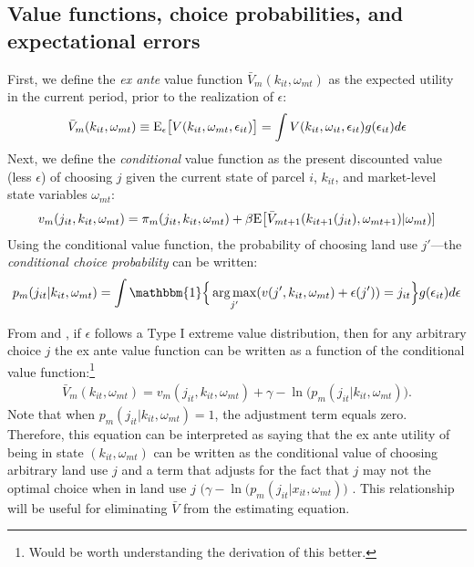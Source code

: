 \documentclass[11pt]{article}
\newcommand{\Exp}{\textnormal{E}}
\DeclareMathOperator*{\argmax}{arg\,max}
\begin{document}
\subsection{Value functions, choice probabilities, and expectational errors}

First, we define the {\em ex ante} value function $\bar{V}_m(k_{it},\omega_{mt})$ as the expected utility in the current period, prior to the realization of $\epsilon$:
\begin{align} \label{eq:exante}
\bar{V}_m(k_{it},\omega_{mt}) \equiv \Exp_\epsilon \big[V(k_{it},\omega_{mt},\epsilon_{it})\big] = \int V(k_{it},\omega_{it},\epsilon_{it}) g(\epsilon_{it}) d\epsilon
\end{align}
Next, we define the {\em conditional} value function as the present discounted value (less $\epsilon$) of choosing $j$ given the current state of parcel $i$, $k_{it}$, and market-level state variables $\omega_{mt}$:
\begin{align} \label{eq:condval}
v_m(j_{it}, k_{it},\omega_{mt}) = \pi_m(j_{it},k_{it},\omega_{mt}) + \beta \Exp\big[\bar{V}_{mt+1}(k_{it+1}(j_{it}),\omega_{mt+1}) | \omega_{mt})]
\end{align}
Using the conditional value function, the probability of choosing land use $j'$---the {\em conditional choice probability} can be written:
\begin{align} \label{eq:probs}
p_m(j_{it}|k_{it},\omega_{mt}) = \int \mathbbm{1}\Big\{\argmax_{j'} (v(j',k_{it},\omega_{mt}) + \epsilon(j')) = j_{it} \Big\} g(\epsilon_{it}) d\epsilon
\end{align}

From \citet{arcidiaconomiller} and \citet{hotzmiller}, if $\epsilon$ follows a Type I extreme value distribution, then for any arbitrary choice $j$ the ex ante value function can be written as a function of the conditional value function:\footnote{Would be worth understanding the derivation of this better.}
\begin{align} \label{eq:hm}
\bar{V}_m(k_{it},\omega_{mt}) = v_m(j_{it},k_{it},\omega_{mt}) + \gamma - \ln\big(p_m(j_{it}|k_{it},\omega_{mt})\big).
\end{align}
Note that when $p_m(j_{it}|k_{it},\omega_{mt}) = 1$, the adjustment term equals zero. Therefore, this equation can be interpreted as saying that the ex ante utility of being in state $(k_{it},\omega_{mt})$ can be written as the conditional value of choosing arbitrary land use $j$ and a term that adjusts for the fact that $j$ may not the optimal choice when in land use $j$  $\big(\gamma - \ln\big(p_m(j_{it}|x_{it},\omega_{mt})\big)$ \citep{arcidiaconoellickson}. This relationship will be useful for eliminating $\bar{V}$ from the estimating equation.
\end{document}
